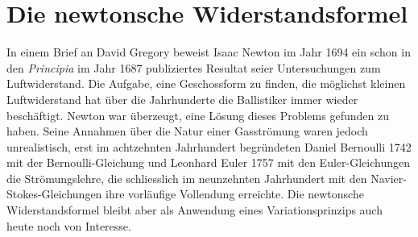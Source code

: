 %
%
%
%
\chapter{Die newtonsche Widerstandsformel\label{chapter:widerstand}}
\begin{refsection}

\noindent
In einem Brief an David Gregory beweist Isaac Newton im Jahr 1694
ein schon in den {\em Principia} \cite{widerstand:principia}
im Jahr 1687 publiziertes Resultat seier Untersuchungen zum
Luftwiderstand.
Die Aufgabe, eine Geschossform zu finden, die möglichst kleinen
Luftwiderstand hat über die Jahrhunderte die Ballistiker immer 
wieder beschäftigt.
Newton war überzeugt, eine Lösung dieses Problems gefunden zu haben.
Seine Annahmen über die Natur einer Gasströmung waren jedoch 
unrealistisch, erst im achtzehnten Jahrhundert begründeten
Daniel Bernoulli 1742 mit der Bernoulli-Gleichung und Leonhard Euler
1757 mit den Euler-Gleichungen die Strömungslehre, die schliesslich im
neunzehnten Jahrhundert mit den Navier-Stokes-Gleichungen ihre
vorläufige Vollendung erreichte.
Die newtonsche Widerstandsformel bleibt aber als Anwendung eines
Variationsprinzips auch heute noch von Interesse.




\printbibliography[heading=subbibliography]
\end{refsection}
